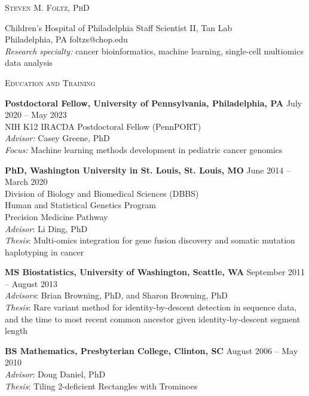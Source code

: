 \documentclass[11pt]{article}
\begin{document}
\textsc{{\huge Steven M. Foltz, PhD}}

\bigskip

Children's Hospital of Philadelphia \hfill Staff Scientist II, Tan Lab \\
Philadelphia, PA \hfill foltzs@chop.edu \\

\emph{Research specialty:} cancer bioinformatics, machine learning, single-cell multiomics data analysis

\hrulefill

\bigskip

\textsc{{\Large Education and Training}}

\bigskip

\textbf{Postdoctoral Fellow, University of Pennsylvania, Philadelphia, PA} \hfill July 2020 -- May 2023 \\
NIH K12 IRACDA Postdoctoral Fellow (PennPORT) \\
\emph{Advisor:} Casey Greene, PhD \\
\emph{Focus:} Machine learning methods development in pediatric cancer genomics

\bigskip

\textbf{PhD, Washington University in St. Louis, St. Louis, MO} \hfill June 2014 -- March 2020 \\
Division of Biology and Biomedical Sciences (DBBS) \\
Human and Statistical Genetics Program \\
Precision Medicine Pathway \\
\emph{Advisor}: Li Ding, PhD \\
\emph{Thesis}: Multi-omics integration for gene fusion discovery and somatic mutation haplotyping in cancer

\bigskip

\textbf{MS Biostatistics, University of Washington, Seattle, WA} \hfill September 2011 -- August 2013 \\
\emph{Advisors}: Brian Browning, PhD, and Sharon Browning, PhD \\
\emph{Thesis}: Rare variant method for identity-by-descent detection in sequence data, and the time to most recent common ancestor given identity-by-descent segment length

\bigskip

\textbf{BS Mathematics, Presbyterian College, Clinton, SC} \hfill August 2006 -- May 2010 \\
\emph{Advisor}: Doug Daniel, PhD \\
\emph{Thesis}: Tiling 2-deficient Rectangles with Trominoes
\end{document}
